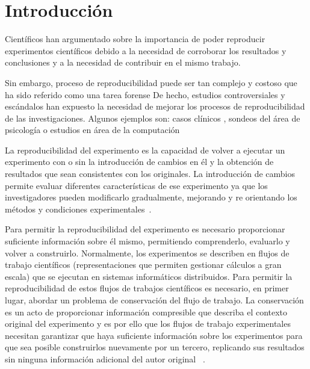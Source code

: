 \chapter{Introducción}
\label{Chapter1} 
\newcommand{\keyword}[1]{\textbf{#1}}
\newcommand{\tabhead}[1]{\textbf{#1}}
\newcommand{\code}[1]{\texttt{#1}}
\newcommand{\file}[1]{\texttt{\bfseries#1}}
\newcommand{\option}[1]{\texttt{\itshape#1}}

Científicos han argumentado sobre la importancia de poder reproducir experimentos científicos debido a la necesidad de corroborar los resultados y conclusiones y a la necesidad de contribuir en el mismo trabajo. 

Sin embargo, proceso de reproducibilidad puede ser tan complejo y costoso que ha sido referido como una tarea forense \cite{baggerly2009deriving}
De hecho, estudios controversiales y escándalos han expuesto la necesidad de mejorar los procesos de reproducibilidad de las investigaciones. Algunos ejemplos son: casos clínicos \cite{ioannidis2009repeatability}, sondeos del área de psicología \cite{open2015estimating} o estudios en área de la computación \cite{baggerly2009deriving}

La reproducibilidad del experimento es la capacidad de volver a ejecutar un experimento con o sin la introducción de cambios en él y la obtención de resultados que sean consistentes con los originales.
La introducción de cambios permite evaluar diferentes características de ese experimento ya que los investigadores pueden modificarlo gradualmente, mejorando y re orientando los métodos y condiciones experimentales~\cite{stodden2010reproducible}.

Para permitir la reproducibilidad del experimento es necesario proporcionar suficiente información sobre él mismo, permitiendo comprenderlo, evaluarlo y volver a construirlo. Normalmente, los experimentos se describen en flujos de trabajo científicos (representaciones que permiten gestionar cálculos a gran escala) que se ejecutan en sistemas informáticos distribuidos. 
Para permitir la reproducibilidad de estos flujos de trabajos científicos es necesario, en primer lugar, abordar un problema de conservación del flujo de trabajo. 
La conservación es un acto de proporcionar información compresible que describa el contexto original del experimento  y es por ello que los flujos de trabajo experimentales necesitan garantizar que haya suficiente información sobre los experimentos para que sea posible construirlos nuevamente por un tercero, replicando sus resultados sin ninguna información adicional del autor original ~\cite{garijo2013quantifying}. 

